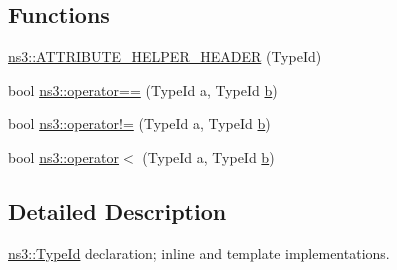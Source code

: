 \subsection*{Functions}
\begin{DoxyCompactItemize}
\item 
\hyperlink{namespacens3_a33081b599f115dddf4c3c74cf86fc0d5}{ns3\+::\+A\+T\+T\+R\+I\+B\+U\+T\+E\+\_\+\+H\+E\+L\+P\+E\+R\+\_\+\+H\+E\+A\+D\+ER} (Type\+Id)
\end{DoxyCompactItemize}
{\bf }\par
\begin{DoxyCompactItemize}
\item 
bool \hyperlink{namespacens3_afe496289bf2bb84675cf4ea8addeefae}{ns3\+::operator==} (Type\+Id a, Type\+Id \hyperlink{lte__pathloss_8m_a21ad0bd836b90d08f4cf640b4c298e7c}{b})
\item 
bool \hyperlink{namespacens3_a845994d0b06113542b58020025f09c17}{ns3\+::operator!=} (Type\+Id a, Type\+Id \hyperlink{lte__pathloss_8m_a21ad0bd836b90d08f4cf640b4c298e7c}{b})
\item 
bool \hyperlink{namespacens3_a5b694614b4f77fd56e8e2f4db05242e2}{ns3\+::operator$<$} (Type\+Id a, Type\+Id \hyperlink{lte__pathloss_8m_a21ad0bd836b90d08f4cf640b4c298e7c}{b})
\end{DoxyCompactItemize}



\subsection{Detailed Description}
\hyperlink{classns3_1_1TypeId}{ns3\+::\+Type\+Id} declaration; inline and template implementations. 